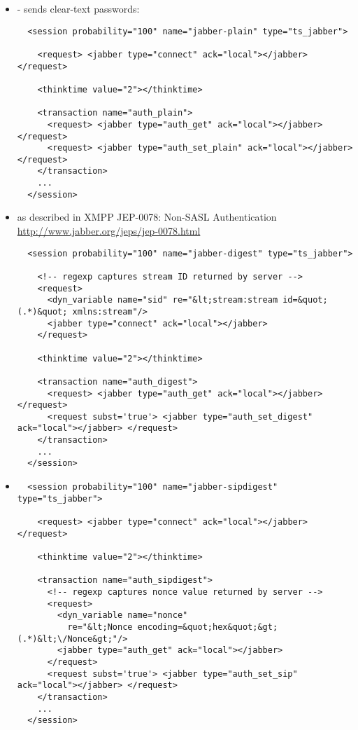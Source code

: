 \documentclass{TSUNG-en}
\begin{document}
\begin{itemize}
\item {} - sends clear-text passwords:
\begin{Verbatim}
  <session probability="100" name="jabber-plain" type="ts_jabber">

    <request> <jabber type="connect" ack="local"></jabber> </request>

    <thinktime value="2"></thinktime>

    <transaction name="auth_plain">
      <request> <jabber type="auth_get" ack="local"></jabber> </request>
      <request> <jabber type="auth_set_plain" ack="local"></jabber> </request>
    </transaction>
    ...
  </session>
\end{Verbatim}
\item {}  as described in XMPP JEP-0078: Non-SASL Authentication
   \url{http://www.jabber.org/jeps/jep-0078.html}
\begin{Verbatim}
  <session probability="100" name="jabber-digest" type="ts_jabber">

    <!-- regexp captures stream ID returned by server -->
    <request>
      <dyn_variable name="sid" re="&lt;stream:stream id=&quot;(.*)&quot; xmlns:stream"/>
      <jabber type="connect" ack="local"></jabber>
    </request>

    <thinktime value="2"></thinktime>

    <transaction name="auth_digest">
      <request> <jabber type="auth_get" ack="local"></jabber> </request>
      <request subst='true'> <jabber type="auth_set_digest" ack="local"></jabber> </request>
    </transaction>
    ...
  </session>
\end{Verbatim}
\item {}
\begin{Verbatim}
  <session probability="100" name="jabber-sipdigest" type="ts_jabber">

    <request> <jabber type="connect" ack="local"></jabber> </request>

    <thinktime value="2"></thinktime>

    <transaction name="auth_sipdigest">
      <!-- regexp captures nonce value returned by server -->
      <request>
        <dyn_variable name="nonce"
          re="&lt;Nonce encoding=&quot;hex&quot;&gt;(.*)&lt;\/Nonce&gt;"/>
        <jabber type="auth_get" ack="local"></jabber>
      </request>
      <request subst='true'> <jabber type="auth_set_sip" ack="local"></jabber> </request>
    </transaction>
    ...
  </session>
\end{Verbatim}
\end{itemize}
\end{document}
